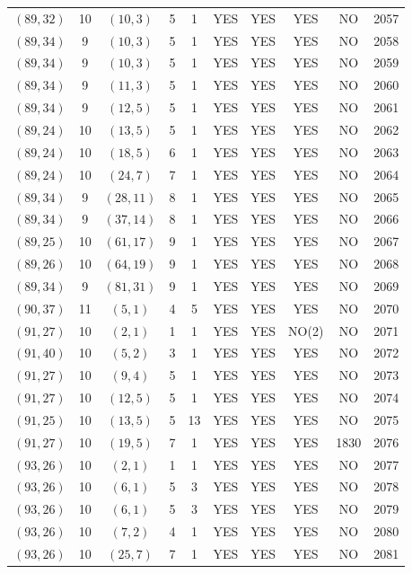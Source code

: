 \begin{longtable}{|c|c|c|c|c|c|c|c|c|c|}
$(89, 32)$ & 10 & $(10, 3)$ & 5 & 1 & YES & YES & YES & NO & 2057\\
$(89, 34)$ & 9 & $(10, 3)$ & 5 & 1 & YES & YES & YES & NO & 2058\\
$(89, 34)$ & 9 & $(10, 3)$ & 5 & 1 & YES & YES & YES & NO & 2059\\
$(89, 34)$ & 9 & $(11, 3)$ & 5 & 1 & YES & YES & YES & NO & 2060\\
$(89, 34)$ & 9 & $(12, 5)$ & 5 & 1 & YES & YES & YES & NO & 2061\\
$(89, 24)$ & 10 & $(13, 5)$ & 5 & 1 & YES & YES & YES & NO & 2062\\
$(89, 24)$ & 10 & $(18, 5)$ & 6 & 1 & YES & YES & YES & NO & 2063\\
$(89, 24)$ & 10 & $(24, 7)$ & 7 & 1 & YES & YES & YES & NO & 2064\\
$(89, 34)$ & 9 & $(28, 11)$ & 8 & 1 & YES & YES & YES & NO & 2065\\
$(89, 34)$ & 9 & $(37, 14)$ & 8 & 1 & YES & YES & YES & NO & 2066\\
$(89, 25)$ & 10 & $(61, 17)$ & 9 & 1 & YES & YES & YES & NO & 2067\\
$(89, 26)$ & 10 & $(64, 19)$ & 9 & 1 & YES & YES & YES & NO & 2068\\
$(89, 34)$ & 9 & $(81, 31)$ & 9 & 1 & YES & YES & YES & NO & 2069\\
$(90, 37)$ & 11 & $(5, 1)$ & 4 & 5 & YES & YES & YES & NO & 2070\\
$(91, 27)$ & 10 & $(2, 1)$ & 1 & 1 & YES & YES & NO(2) & NO & 2071\\
$(91, 40)$ & 10 & $(5, 2)$ & 3 & 1 & YES & YES & YES & NO & 2072\\
$(91, 27)$ & 10 & $(9, 4)$ & 5 & 1 & YES & YES & YES & NO & 2073\\
$(91, 27)$ & 10 & $(12, 5)$ & 5 & 1 & YES & YES & YES & NO & 2074\\
$(91, 25)$ & 10 & $(13, 5)$ & 5 & 13 & YES & YES & YES & NO & 2075\\
$(91, 27)$ & 10 & $(19, 5)$ & 7 & 1 & YES & YES & YES & 1830 & 2076\\
$(93, 26)$ & 10 & $(2, 1)$ & 1 & 1 & YES & YES & YES & NO & 2077\\
$(93, 26)$ & 10 & $(6, 1)$ & 5 & 3 & YES & YES & YES & NO & 2078\\
$(93, 26)$ & 10 & $(6, 1)$ & 5 & 3 & YES & YES & YES & NO & 2079\\
$(93, 26)$ & 10 & $(7, 2)$ & 4 & 1 & YES & YES & YES & NO & 2080\\
$(93, 26)$ & 10 & $(25, 7)$ & 7 & 1 & YES & YES & YES & NO & 2081\\

\end{longtable}
